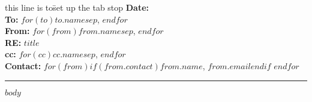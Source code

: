 \documentclass[11pt]{article}
\begin{document}
\makeatletter
\let\insertdate\@date
\makeatother


\vspace{0.1cm}
\begin{flushleft}
\begin{tabbing}
this line is to\= set up the tab stop \kill
{\bf Date:} \> \insertdate \\
{\bf To:} \>  $for(to)$$to.name$$sep$, $endfor$\\
{\bf From:} \> $for(from)$$from.name$$sep$, $endfor$\\
{\bf RE:} \> $title$ \\
{\bf cc:} \> $for(cc)$$cc.name$$sep$, $endfor$ \\
{\bf Contact:} \> $for(from)$$if(from.contact)$$from.name$, $from.email$$endif$ $endfor$\\
\end{tabbing}
\end{flushleft}

\hrule

\vspace{2cm}


\makeatletter
\patchcmd{\@fancyhead}{\rlap}{\color{gray}\rlap}{}{}
\patchcmd{\headrule}{\hrule}{\color{gray}\hrule}{}{}
\patchcmd{\@fancyfoot}{\rlap}{\color{gray}\rlap}{}{}
\patchcmd{\footrule}{\hrule}{\color{gray}\hrule}{}{}
\makeatother



\begin{abstract}
$summary$
\end{abstract}

\newpage
{}


$body$
\end{document}
